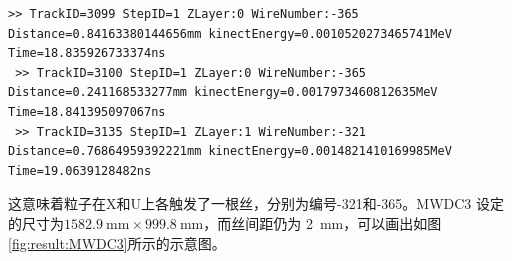\documentclass[bachelor,openany,oneside,color]{buaathesis}
\begin{document}
\begin{lstlisting}[caption={MWDC3},firstnumber=4213,lastline=4215]
 >> TrackID=3099 StepID=1 ZLayer:0 WireNumber:-365 Distance=0.84163380144656mm kinectEnergy=0.0010520273465741MeV Time=18.835926733374ns
 >> TrackID=3100 StepID=1 ZLayer:0 WireNumber:-365 Distance=0.241168533277mm kinectEnergy=0.0017973460812635MeV Time=18.841395097067ns
 >> TrackID=3135 StepID=1 ZLayer:1 WireNumber:-321 Distance=0.76864959392221mm kinectEnergy=0.0014821410169985MeV Time=19.0639128482ns
\end{lstlisting}

这意味着粒子在X和U上各触发了一根丝，分别为编号-321和-365。MWDC3
设定的尺寸为$\SI{1582.9}{\milli\meter}\times\SI{999.8}{\milli\meter}$，而丝间距仍为
\SI{2}{\milli\meter}，可以画出如图\ref{fig:result:MWDC3}所示的示意图。
\end{document}
